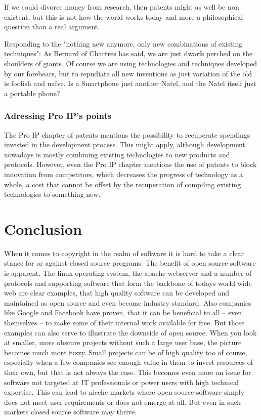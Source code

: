 \documentclass[a4paper]{report}
\begin{document}
If we could divorce money from research, then patents might as well be non existent, but this is not how the world works today and more a philosophical question than a real argument.

Responding to the "nothing new anymore, only new combinations of existing techniques": As Bernard of Chartres has said, we are just dwarfs perched on the shoulders of giants. Of course we are using technologies and techniques developed by our forebears, but to repudiate all new inventions as just variation of the old is foolish and naïve. Is a Smartphone just another Natel, and the Natel itself just a portable phone?

\subsection{Adressing Pro IP's points}
The Pro IP chapter of patents mentions the possibility to recuperate spendings invested in the development process. This might apply, although development nowadays is mostly combining existing technologies to new products and protocols. However, even the Pro IP chapter mentions the use of patents to block innovation from competitors, which decreases the progress of technology as a whole, a cost that cannot be offset by the recuperation of compiling existing technologies to something new.

\chapter{Conclusion}
\label{ch:Concl}

When it comes to copyright in the realm of software it is hard to take a clear stance for or against closed source programs. The benefit of open source software is apparent. The linux operating system, the apache webserver and a number of protocols and supporting software that form the backbone of todays world wide web are clear examples, that high quality software can be developed and maintained as open source and even become industry standard. Also companies like Google and Facebook have proven, that it can be beneficial to all -- even themselves -- to make some of their internal work available for free. But those examples can also serve to illustrate the downside of open source. When you look at smaller, more obscure projects without such a large user base, the picture becomes much more fuzzy. Small projects can be of high quality too of course, especially when a few companies see enough value in them to invest resources of their own, but that is not always the case. This becomes even more an issue for software not targeted at IT professionals or power users with high technical expertise. This can lead to nieche markets where open source software simply does not meet user requirements or does not emerge at all. But even in such markets closed source software may thrive.


\newpage

\printbibliography
\end{document}
